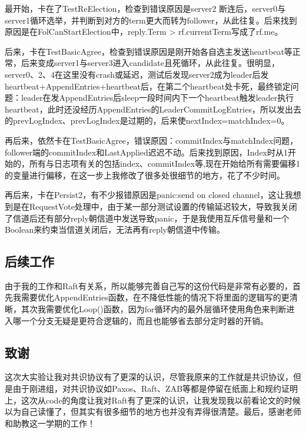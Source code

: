 \documentclass[UTF8]{article}
\begin{document}
最开始，卡在了TestReElection，检查到错误原因是server2 断连后，server0与server1循环选举，并判断到对方的term更大而转为follower，从此往复。后来找到原因是在FolCanStartElection中，reply.Term > rf.currentTerm写成了rf.me。

后来，卡在TestBasicAgree，检查到错误原因是刚开始各自选主发送heartbeat等正常，后来变成server1与server3进入candidate且死循环，从此往复。很明显，server0、2、4在这里没有crash或延迟，测试后发现server2成为leader后发heartbeat+AppendEntries+heartbeat后，在第二个heartbeat处卡死，最终锁定问题：leader在发AppendEntries后sleep一段时间内下一个heartbeat触发leader执行heartbeat，此时还没经历AppendEntries的LeaderCommitLogEntries，所以发出去的prevLogIndex、prevLogIndex是过期的，后来使nextIndex=matchIndex=0。

再后来，依然卡在TestBasicAgree，错误原因：commitIndex与matchIndex问题，follower端的commitIndex和LastApplied迟迟不动。后来找到原因，Index时从1开始的，所有与日志项有关的包括index、commitIndex等,现在开始给所有需要偏移1的变量进行偏移，在这一步上我修改了很多处很细节的地方，花了不少时间。

再后来，卡在Persist2，有不少报错原因是panic:send on closed channel，这让我想到是在RequestVote处理中，由于某一部分测试设置的传输延迟较大，导致我关闭了信道后还有部分reply朝信道中发送导致panic，于是我使用互斥信号量和一个Boolean来约束当信道关闭后，无法再有reply朝信道中传输。

\subsection{后续工作}

由于我的工作和Raft有关系，所以能够完善自己写的这份代码是非常有必要的，首先我需要优化AppendEntries函数，在不降低性能的情况下将里面的逻辑写的更清晰，其次我需要优化Loop()函数，因为for循环内的最外层循环使用角色来判断进入哪一个分支无疑是更符合逻辑的，而且也能够省去部分定时器的开销。

\subsection{致谢}

这次大实验让我对共识协议有了更深的认识，尽管我原来的工作就是共识协议，但是由于刚进组，对共识协议如Paxos、Raft、ZAB等都是停留在纸面上和规约证明上，这次从code的角度让我对Raft有了更深的认识，让我发现我以前看论文的时候以为自己读懂了，但其实有很多细节的地方也并没有弄得很清楚。最后，感谢老师和助教这一学期的工作！

 
\end{document}
